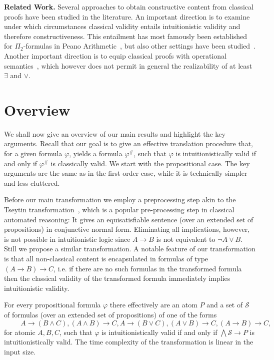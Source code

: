 \documentclass[runningheads]{llncs}
\begin{document}
\textbf{Related Work.}
Several approaches to obtain constructive content from classical proofs have been studied in the literature.
An important direction is to examine under which circumstances classical validity entails intuitionistic validity and therefore constructiveness.
This entailment has most famously been established for $\Pi_2$-formulas in Peano Arithmetic~\cite{friedman1978classically}, but also other settings have been studied~\cite{schwichtenberg}.
Another important direction is to equip classical proofs with operational semantics~\cite{Control1,Parigot1}, which however does not permit in general the realizability of at least $\exists$ and $\vee$.



\section{Overview}

We shall now give an overview of our main results and highlight the key arguments. Recall that our goal is to give an effective translation procedure that, for a given formula $\varphi$, yields a formula $\varphi^\#$, such that $\varphi$ is intuitionistically valid if and only if $\varphi^\#$ is classically valid. We start with the propositional case. The key arguments are the same as in the first-order case, while it is technically simpler and less cluttered.

Before our main transformation we employ a preprocessing step akin to the Tseytin transformation~\cite{tseitin1983complexity}, which is a popular pre-processing step in classical automated reasoning:
It gives an equisatisfiable sentence (over an extended set of propositions) in conjunctive normal form.
Eliminating all implications, however, is not possible in intuitionistic logic since $A\to B$ is not equivalent to $\neg A\vee B$.
Still we propose a similar transformation.
A notable feature of our transformation is that all non-classical content is encapsulated in formulas of type $(A\to B)\to C$, i.e. if there are no such formulas in the transformed formula then the classical validity of the transformed formula immediately implies intuitionistic validity.

\begin{theorem}\label{thm:Tseytin}
For every propositional formula $\varphi$ there effectively are an atom $P$ and a set of $\mathcal S$ of formulas (over an extended set of propositions) of one of the forms\\
$\hspace{1cm} A\to (B\wedge C), (A\wedge B)\to C, A\to (B\vee C), (A\vee B)\to C, (A\to B)\to C,$\\
for atomic $A, B, C$, such that $\varphi$ is intuitionistically valid if and only if $\bigwedge\mathcal S\to P$ is intuitionistically valid. The time complexity of the transformation is linear in the input size.
\end{theorem}
\end{document}
